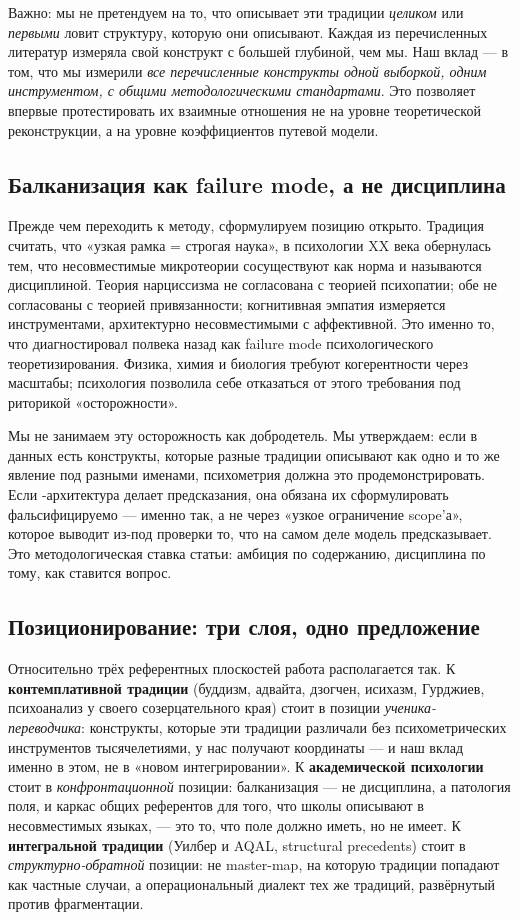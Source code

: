 \medskip
Важно: мы не претендуем на то, что \DEIC{} описывает эти традиции \emph{целиком} или \emph{первыми} ловит структуру, которую они описывают. Каждая из перечисленных литератур измеряла свой конструкт с большей глубиной, чем мы. Наш вклад --- в том, что мы измерили \emph{все перечисленные конструкты одной выборкой, одним инструментом, с общими методологическими стандартами}. Это позволяет впервые протестировать их взаимные отношения не на уровне теоретической реконструкции, а на уровне коэффициентов путевой модели.

\subsection{Балканизация как failure mode, а не дисциплина}

Прежде чем переходить к методу, сформулируем позицию открыто. Традиция считать, что «узкая рамка = строгая наука», в психологии XX века обернулась тем, что несовместимые микротеории сосуществуют как норма и называются дисциплиной. Теория нарциссизма не согласована с теорией психопатии; обе не согласованы с теорией привязанности; когнитивная эмпатия измеряется инструментами, архитектурно несовместимыми с аффективной. Это именно то, что \citet{meehl1978} диагностировал полвека назад как failure mode психологического теоретизирования. Физика, химия и биология требуют когерентности через масштабы; психология позволила себе отказаться от этого требования под риторикой «осторожности».

Мы не занимаем эту осторожность как добродетель. Мы утверждаем: если в данных есть конструкты, которые разные традиции описывают как одно и то же явление под разными именами, психометрия должна это продемонстрировать. Если \DEIC{}-архитектура делает предсказания, она обязана их сформулировать фальсифицируемо --- именно так, а не через «узкое ограничение scope'а», которое выводит из-под проверки то, что на самом деле модель предсказывает. Это методологическая ставка статьи: амбиция по содержанию, дисциплина по тому, как ставится вопрос.

\subsection{Позиционирование: три слоя, одно предложение}

Относительно трёх референтных плоскостей работа располагается так. К \textbf{контемплативной традиции} (буддизм, адвайта, дзогчен, исихазм, Гурджиев, психоанализ у своего созерцательного края) \DEIC{} стоит в позиции \emph{ученика-переводчика}: конструкты, которые эти традиции различали без психометрических инструментов тысячелетиями, у нас получают координаты --- и наш вклад именно в этом, не в «новом интегрировании». К \textbf{академической психологии} \DEIC{} стоит в \emph{конфронтационной} позиции: балканизация --- не дисциплина, а патология поля, и каркас общих референтов для того, что школы описывают в несовместимых языках, --- это то, что поле должно иметь, но не имеет. К \textbf{интегральной традиции} (Уилбер и AQAL, structural precedents) \DEIC{} стоит в \emph{структурно-обратной} позиции: не master-map, на которую традиции попадают как частные случаи, а операциональный диалект тех же традиций, развёрнутый против фрагментации.

